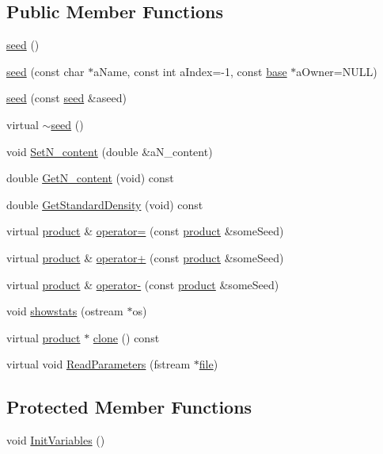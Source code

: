 \subsection*{Public Member Functions}
\begin{DoxyCompactItemize}
\item 
\hyperlink{classseed_a62b6981b66ef380c180afac5585ef00d}{seed} ()
\item 
\hyperlink{classseed_a3301a5b3bcd3101215bcad5168ac3d29}{seed} (const char $\ast$aName, const int aIndex=-\/1, const \hyperlink{classbase}{base} $\ast$aOwner=NULL)
\item 
\hyperlink{classseed_a91e6c864eb05fe0924e8e6d8392c2fbf}{seed} (const \hyperlink{classseed}{seed} \&aseed)
\item 
virtual \hyperlink{classseed_acab13d9e431a56786c8d4b7f50085ac8}{$\sim$seed} ()
\item 
void \hyperlink{classseed_afc3e85e33e9c79809a1c600e990d196a}{SetN\_\-content} (double \&aN\_\-content)
\item 
double \hyperlink{classseed_a677b6a35306d0e55fb71b78182cbfb15}{GetN\_\-content} (void) const 
\item 
double \hyperlink{classseed_a716b7477525fd7eb4cb4c7144bbb1d8c}{GetStandardDensity} (void) const 
\item 
virtual \hyperlink{classproduct}{product} \& \hyperlink{classseed_af52e1504b4da971919e451f53fa0802f}{operator=} (const \hyperlink{classproduct}{product} \&someSeed)
\item 
virtual \hyperlink{classproduct}{product} \& \hyperlink{classseed_acb2c018454084660561fa623ca2ee6da}{operator+} (const \hyperlink{classproduct}{product} \&someSeed)
\item 
virtual \hyperlink{classproduct}{product} \& \hyperlink{classseed_a950984dedb76a7de041bc2ca20a0ecdd}{operator-\/} (const \hyperlink{classproduct}{product} \&someSeed)
\item 
void \hyperlink{classseed_aef923afa921c9ef6b772d0ee573159f4}{showstats} (ostream $\ast$os)
\item 
virtual \hyperlink{classproduct}{product} $\ast$ \hyperlink{classseed_a0e2e68f7724e0551b885433a1e935ebf}{clone} () const 
\item 
virtual void \hyperlink{classseed_a8212329dfb9f4a2bc4c8a0fe401efaf3}{ReadParameters} (fstream $\ast$\hyperlink{classbase_a3af52ee9891719d09b8b19b42450b6f6}{file})
\end{DoxyCompactItemize}
\subsection*{Protected Member Functions}
\begin{DoxyCompactItemize}
\item 
void \hyperlink{classseed_aabcb716243f0c8e8c57f05cf0f140a17}{InitVariables} ()
\end{DoxyCompactItemize}
